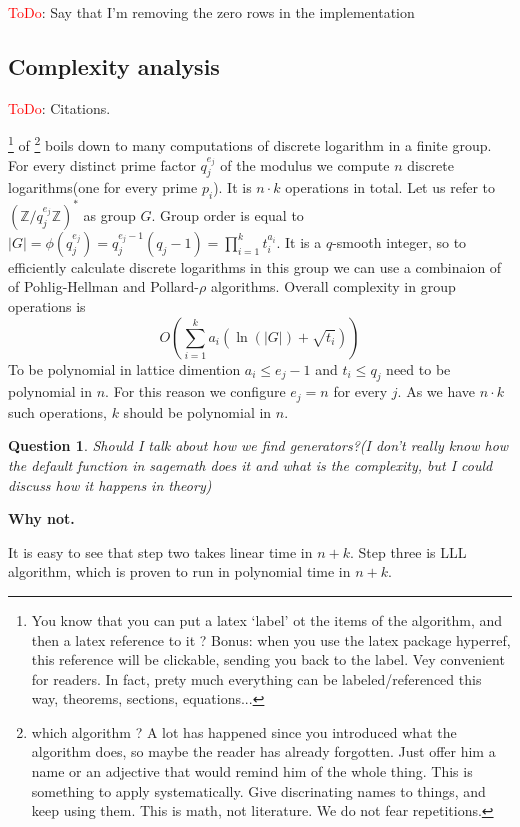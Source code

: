 \documentclass[12pt]{article}
\newcommand{\ZZ}{\mathbb{Z}}
\newtheorem{question}{Question}
\def\toimprove{\bgroup \markoverwith{\textcolor{red}{\lower4.5pt\hbox{\sixly \char58}}}\ULon}
\begin{document}
 \textcolor{red}{ToDo}:  Say that I'm removing the zero rows in the implementation

\subsection{Complexity analysis}
\textcolor{red}{ToDo}: Citations.

\toimprove{Step one}\footnote{You know that you can put a latex `label' ot the items of the algorithm, and then a latex reference to it ? Bonus: when you use the latex package hyperref, this reference will be clickable, sending you back to the label. Vey convenient for readers. In fact, prety much everything can be labeled/referenced this way, theorems, sections, equations...} of \toimprove{the algorithm}\footnote{which algorithm ? A lot has happened since you introduced what the algorithm does, so maybe the reader has already forgotten. Just offer him a name or an adjective that would remind him of the whole thing. This is something to apply systematically. Give discrinating names to things, and keep using them. This is math, not literature. We do not fear repetitions. } boils down to many computations of discrete logarithm in a finite group. For every distinct prime factor $q_{j}^{e_{j}}$ of the modulus we compute $n$ discrete logarithms(one for every prime $p_{i}$). It is $n \cdot k$ operations in total. Let us refer to $(\ZZ/q_{j}^{e_{j}}\ZZ)^*$ as group $G$. Group order is equal to $|G| = \phi(q_{j}^{e_{j}}) =  q_{j}^{e_{j}-1}(q_{j}-1) = \prod_{i=1}^{k} t_{i}^{a_{i}}$.
It is a $q$-smooth integer, so to efficiently calculate discrete logarithms in this group we can use a combinaion of of Pohlig-Hellman and Pollard-$\rho$ algorithms. Overall complexity in group operations is
\begin{equation}
    O(\sum_{i=1}^{k} a_{i}(\ln(|G|) + \sqrt{t_{i}}))
\end{equation}
To be polynomial in lattice dimention $a_{i} \leq e_{j}-1$ and $t_{i} \leq q_{j}$ need to be polynomial in $n$. For this reason we configure $e_{j} = n$ for every $j$. As we have $n \cdot k$ such operations, $k$ should be polynomial in $n$.

\begin{question}
    Should I talk about how we find generators?(I don't really know how the default function in sagemath does it and what is the complexity, but I could discuss how it happens in theory)
\end{question}
{\bf Why not. }

It is easy to see that step two takes linear time in $n + k$. Step three is LLL algorithm, which is proven to run in polynomial time in $n + k$.
\end{document}

